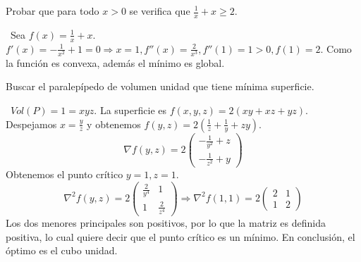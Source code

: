 \documentclass[twoside]{article}
\begin{document}
\newpage 

\begin{ejercicio}{6}
Probar que para todo $x>0$ se verifica que $\frac{1}{x}+x\geq 2$.

\begin{solucion}\
Sea $f(x)=\frac{1}{x}+x$. $f'(x)=-\frac{1}{x^2}+1=0\Rightarrow x=1, f''(x)=\frac{2}{x^3},f''(1)=1>0, f(1)=2$. Como la función es convexa, además el mínimo es global.
\end{solucion}
\end{ejercicio}

\newpage 

\begin{ejercicio}{7}
Buscar el paralepípedo de volumen unidad que tiene mínima superficie. 

\begin{solucion}\
$Vol(P)=1=xyz$. La superficie es $f(x,y,z)=2(xy+xz+yz)$. Despejamos $x=\frac{y}{z}$ y obtenemos $f(y,z)=2(\frac{1}{z}+\frac{1}{y}+zy)$. 
$$\nabla f(y,z)=2\begin{pmatrix}
-\frac{1}{y^2}+z\\
-\frac{1}{z^2}+y
\end{pmatrix}$$
Obtenemos el punto crítico $y=1,z=1$.
$$\nabla^2f(y,z)=2\begin{pmatrix}
\frac{2}{y^4} & 1\\
1 & \frac{2}{z^4}
\end{pmatrix}\Rightarrow \nabla^2f(1,1)=2\begin{pmatrix}
2 & 1\\
1 & 2
\end{pmatrix}$$
Los dos menores principales son positivos, por lo que la matriz es definida positiva, lo cual quiere decir que el  punto crítico es un mínimo. En conclusión, el óptimo es el cubo unidad.
\end{solucion}
\end{ejercicio}

\newpage 
\end{document}
